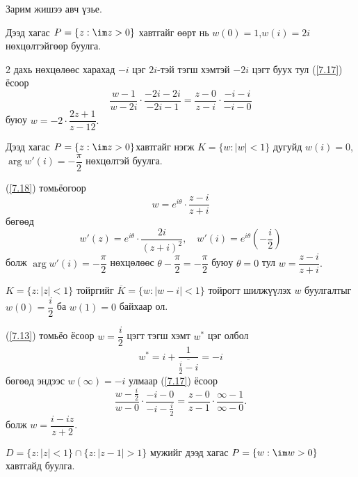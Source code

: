Зарим жишээ авч үзье.
\begin{exm}
Дээд хагас $P=\{z:\im z>0\}$ хавтгайг өөрт нь $w(0)=1$,$w(i)=2i$ нөхцөлтэйгөөр буулга.
\end{exm}
\begin{sol}
2 дахь нөхцөлөөс харахад $-i$ цэг $2i$-тэй тэгш хэмтэй $-2i$ цэгт буух тул (\ref{7.17}) ёсоор 
$$\frac{w-1}{w-2i}\cdot \frac{-2i-2i}{-2i-1}=\frac{z-0}{z-i}\cdot \frac{-i-i}{-i-0}$$ буюу $w=-2\cdot \dfrac{2z+1}{z-12}.$
\end{sol}
\begin{exm}
Дээд хагас $P=\{z:\im z>0\}$хавтгайг нэгж $K=\{w:|w|<1\}$ дугуйд $w(i)=0$, $\arg  w'(i)=-\dfrac{\pi}{2}$ нөхцөлтэй буулга.
\end{exm}
\begin{sol}
(\ref{7.18}) томьёогоор 
$$w=e^{i\theta}\cdot \frac{z-i}{z+i}$$
бөгөөд $$w'(z)=e^{i\theta}\cdot \dfrac{2i}{(z+i)^2}, \quad w'(i)=e^{i\theta} \left(-\dfrac{i}{2}\right)$$ болж $\arg  w'(i)=-\dfrac{\pi}{2}$ нөхцөлөөс $\theta -\dfrac{\pi}{2}=-\dfrac{\pi}{2}$ буюу $\theta= 0$ тул $w=\dfrac{z-i}{z+i}.$
\end{sol}
\begin{exm}
$K=\{z:|z|<1\}$ тойргийг $\overline{K}=\{w:|w-i|<1\}$ тойрогт шилжүүлэх $w$ буулгалтыг $w(0)=\dfrac{i}{2}$ ба $w(1)=0$ байхаар ол.
\end{exm}
\begin{sol}
(\ref{7.13}) томьёо ёсоор $w=\dfrac{i}{2}$ цэгт тэгш хэмт $w^*$ цэг олбол
$$w^*=i+\frac{1}{\overline{\frac{i}{2}-i}}=-i$$
бөгөөд эндээс $w(\infty)=-i$ улмаар (\ref{7.17}) ёсоор
$$\frac{w-\frac{i}{2}}{w-0}\cdot \frac{-i-0}{-i-\frac{i}{2}}=\frac{z-0}{z-1}\cdot \frac{\infty -1}{\infty -0}.$$ болж 
$w=\dfrac{i-iz}{z+2}.$
\end{sol}
\begin{exm}
$D=\{z:|z|<1\}\cap \{z:|z-1|>1\}$ мужийг дээд хагас $P=\{w:\im w>0\}$ хавтгайд буулга.
\end{exm}

